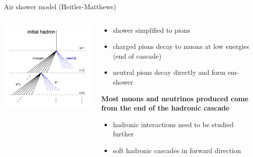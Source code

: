 \documentclass[aspectratio=1610, 9pt]{beamer}
\begin{document}
\begin{frame}{Air shower model (Heitler-Matthews)}
  \begin{columns}
    \begin{column}[c]{0.48\textwidth}
      \includegraphics[width=\textwidth]{plots/HM_model.png}
    \end{column}
    \begin{column}[c]{0.48\textwidth}
      \begin{itemize}
        \item shower simplified to pions
        \item charged pions decay to muons at low energies (end of cascade)
        \item neutral pions decay directly and form em-shower
      \end{itemize}
      \textbf{Most muons and neutrinos produced come from the end of the hadronic cascade}
      \begin{itemize}
        \item hadronic interactions need to be studied further
        \item soft hadronic cascades in forward direction
      \end{itemize}
    \end{column}
  \end{columns}
\end{frame}
\end{document}
